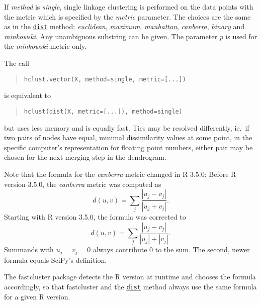 \documentclass[fontsize=10pt,paper=letter,BCOR=-6mm,DIV=8]{scrartcl}
\makeatletter
\newcommand*\q{\textquotesingle}
\newcommand*\dist{\href{https://stat.ethz.ch/R-manual/R-patched/library/stats/html/dist.html}{\texttt{dist}}}
\newenvironment{methods}{%
  \list{}{\labelwidth\z@
    \itemindent-\leftmargin
    \let\makelabel\methodslabel}%
}{%
  \endlist
}
\newcommand*{\methodslabel}[1]{%
  \hbox to \textwidth{\hspace{\labelsep}%
  \normalfont\bfseries\ttfamily
  #1\hskip-\labelsep\hfill}%
}
\makeatother
\begin{document}
\begin{methods}
If \textit{method} is \textit{\q single\q}, single linkage clustering is performed on the data points with the metric which is specified by the \textit{metric} parameter. The choices are the same as in the \dist{} method: \textit{\q euclidean\q}, \textit{\q maximum\q}, \textit{\q manhattan\q}, \textit{\q canberra\q}, \textit{\q binary\q} and \textit{\q minkowski\q}. Any unambiguous substring can be given. The parameter \textit{p} is used for the \textit{\q minkowski\q} metric only.

The call
\begin{quote}
\texttt{hclust.vector(X, method=\q single\q, metric=[...])}
\end{quote}
is equivalent to
\begin{quote}
\texttt{hclust(dist(X, metric=[...]), method=\q single\q)}
\end{quote}
but uses less memory and is equally fast. Ties may be resolved differently, ie.\ if two pairs of nodes have equal, minimal dissimilarity values at some point, in the specific computer's representation for floating point numbers, either pair may be chosen for the next merging step in the dendrogram.

Note that the formula for the \textit{\q canberra\q} metric changed in R 3.5.0: Before R version 3.5.0, the \textit{\q canberra\q} metric was computed as
\[
 d(u,v) = \sum_j\frac{|u_j-v_j|}{|u_j+v_j|}.
\]
Starting with R version 3.5.0, the formula was corrected to
\[
 d(u,v) = \sum_j\frac{|u_j-v_j|}{|u_j|+|v_j|}.
\]
Summands with $u_j=v_j=0$ always contribute 0 to the sum. The second, newer formula equals SciPy's definition.

The fastcluster package detects the R version at runtime and chooses the formula accordingly, so that fastcluster and the \dist{} method always use the same formula for a given R version.


\end{methods}
\end{document}
